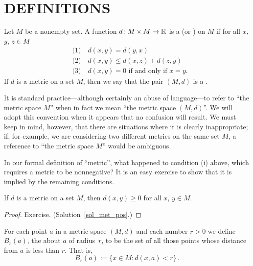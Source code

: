 \section{DEFINITIONS}
\begin{defn}\label{def_met} Let $M$ be a nonempty set. A function $d \colon M \times M \rightarrow \mathbb{R}$ is a
 (or
) on $M$ if for all $x$, $y$, $z \in M$
 \begin{align*}
     &\text{(1)}\quad d(x,y) = d(y,x) \\
     &\text{(2)}\quad d(x,y) \le d(x,z) + d(z,y) \\
     &\text{(3)}\quad d(x,y) = 0 \text{ if and only if } x = y.
 \end{align*}
If $d$ is a metric on a set $M$, then we say that the pair $(M,d)$ is a
.
\end{defn}

It is standard practice---although certainly an abuse of language---to refer to ``the metric
space $M$'' when in fact we mean ``the metric space $(M,d)$''.  We will adopt this convention
when it appears that no confusion will result.  We must keep in mind, however, that there are
situations where it is clearly inappropriate; if, for example, we are considering two
different metrics on the same set $M$, a reference to ``the metric space $M$'' would be
ambiguous.

In our formal definition of ``metric'', what happened to condition (i) above, which requires a
metric to be nonnegative? It is an easy exercise to show that it is implied by the remaining
conditions.

\begin{prop}\label{met_pos} If $d$ is a metric on a set $M$, then $d(x,y) \ge 0$ for all $x$,
$y \in M$.
\end{prop}

\begin{proof} Exercise. (Solution~\ref{sol_met_pos}.)  \ns  \end{proof}

\begin{defn} For each point $a$ in a metric space $(M,d)$ and each number $r > 0$ we define
%
$B_r(a)$, the
 about $a$ of radius~$r$, to be the set of all those points whose distance from
$a$ is less than $r$. That is,
  \[ B_r(a) := \{x \in M \colon d(x,a) < r\}\,. \]
\end{defn}



